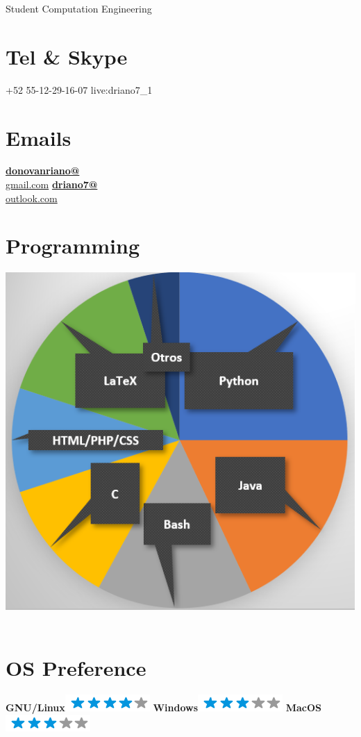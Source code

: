 \documentclass[]{friggeri-cv}
\begin{document}
      {Student Computation Engineering }
      

\begin{aside}
  \section{Tel \& Skype}
    +52 55-12-29-16-07
    live:driano7\_1
    ~
  \section{Emails}
    \href{mailto:donovanriano@gmail.com}{\textbf{donovanriano@}\\gmail.com}
    \href{mailto:driano7@outlook.com}{\textbf{driano7@}\\outlook.com}
    ~
  \section{Programming}
    \includegraphics[scale=0.28]{L1.png}
    ~
  \section{OS Preference}
    \textbf{GNU/Linux}\includegraphics[scale=0.40]{img/4stars.png}
    \textbf{Windows}\includegraphics[scale=0.40]{img/3stars.png}
    \textbf{MacOS}\includegraphics[scale=0.40]{img/3stars.png}
    ~

\end{aside}
\end{document}
